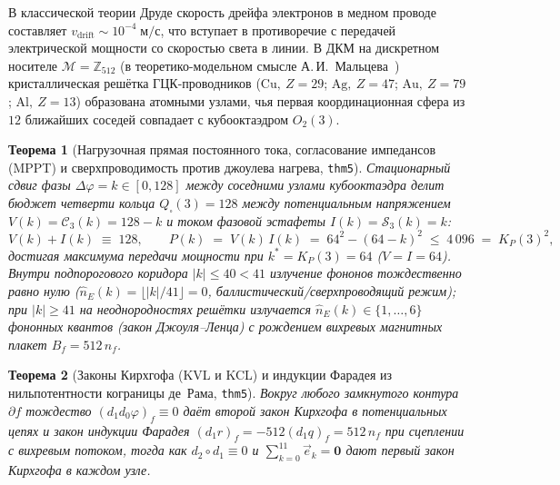 \documentclass[11pt,a4paper]{article}
\newtheorem{theorem}{Теорема}[section]
\theoremstyle{definition}
\theoremstyle{remark}
\begin{document}
В классической теории Друде скорость дрейфа электронов в медном проводе составляет $v_{\mathrm{drift}} \sim 10^{-4}\;\text{м/с}$, что вступает в противоречие с передачей электрической мощности со скоростью света в линии. В ДКМ на дискретном носителе $\mathcal{M} = \mathbb{Z}_{512}$ (в теоретико-модельном смысле А.\,И.~Мальцева~\cite{Malcev1970}) кристаллическая решётка ГЦК-проводников ($\mathrm{Cu},\ Z=29$; $\mathrm{Ag},\ Z=47$; $\mathrm{Au},\ Z=79$; $\mathrm{Al},\ Z=13$) образована атомными узлами, чья первая координационная сфера из $12$ ближайших соседей совпадает с кубооктаэдром $O_2(3)$.

\begin{theorem}[Нагрузочная прямая постоянного тока, согласование импедансов (MPPT) и сверхпроводимость против джоулева нагрева, \texttt{thm5}]
\label{thm:dc-ohm-mppt}
Стационарный сдвиг фазы $\Delta\varphi = k \in [0,128]$ между соседними узлами кубооктаэдра делит бюджет четверти кольца $Q_\square(3) = 128$ между потенциальным напряжением $V(k) = \mathcal{C}_3(k) = 128 - k$ и током фазовой эстафеты $I(k) = \mathcal{S}_3(k) = k$:
\begin{equation}
  \label{eq:dc-ohm-mppt}
  V(k) + I(k) \;\equiv\; 128, \qquad
  P(k) \;=\; V(k)\,I(k) \;=\; 64^2 - (64 - k)^2 \;\le\; 4\,096 \;=\; K_P(3)^2,
\end{equation}
достигая максимума передачи мощности при $k^* = K_P(3) = 64$ ($V = I = 64$). Внутри подпорогового коридора $|k| \le 40 < 41$ излучение фононов тождественно равно нулю ($\hat{n}_E(k) = \lfloor|k|/41\rfloor = 0$, баллистический/сверхпроводящий режим); при $|k| \ge 41$ на неоднородностях решётки излучается $\hat{n}_E(k) \in \{1,\dots,6\}$ фононных квантов (закон Джоуля--Ленца) с рождением вихревых магнитных плакет $B_f = 512\,n_f$.
\end{theorem}

\begin{theorem}[Законы Кирхгофа (KVL и KCL) и индукции Фарадея из нильпотентности кограницы де~Рама, \texttt{thm5}]
\label{thm:kirchhoff-faraday}
Вокруг любого замкнутого контура $\partial f$ тождество $(d_1 d_0\varphi)_f \equiv 0$ даёт второй закон Кирхгофа в потенциальных цепях и закон индукции Фарадея $(d_1 r)_f = -512(d_1 q)_f = 512\,n_f$ при сцеплении с вихревым потоком, тогда как $d_2\circ d_1 \equiv 0$ и $\sum_{k=0}^{11}\vec{e}_k = \mathbf{0}$ дают первый закон Кирхгофа в каждом узле.
\end{theorem}
\end{document}
